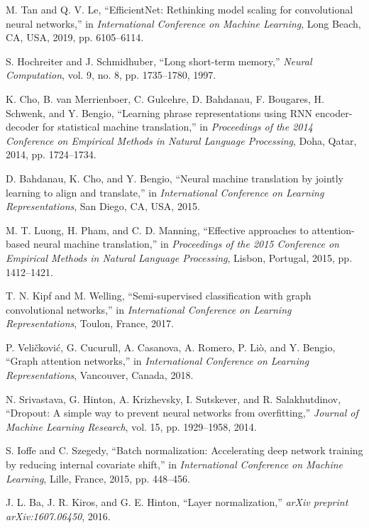 \documentclass[12pt,a4paper]{report}
\begin{document}
\begin{thebibliography}{99}
M. Tan and Q. V. Le, ``EfficientNet: Rethinking model scaling for convolutional neural networks,'' in \textit{International Conference on Machine Learning}, Long Beach, CA, USA, 2019, pp. 6105--6114.

S. Hochreiter and J. Schmidhuber, ``Long short-term memory,'' \textit{Neural Computation}, vol. 9, no. 8, pp. 1735--1780, 1997.

K. Cho, B. van Merrienboer, C. Gulcehre, D. Bahdanau, F. Bougares, H. Schwenk, and Y. Bengio, ``Learning phrase representations using RNN encoder-decoder for statistical machine translation,'' in \textit{Proceedings of the 2014 Conference on Empirical Methods in Natural Language Processing}, Doha, Qatar, 2014, pp. 1724--1734.

D. Bahdanau, K. Cho, and Y. Bengio, ``Neural machine translation by jointly learning to align and translate,'' in \textit{International Conference on Learning Representations}, San Diego, CA, USA, 2015.

M. T. Luong, H. Pham, and C. D. Manning, ``Effective approaches to attention-based neural machine translation,'' in \textit{Proceedings of the 2015 Conference on Empirical Methods in Natural Language Processing}, Lisbon, Portugal, 2015, pp. 1412--1421.

T. N. Kipf and M. Welling, ``Semi-supervised classification with graph convolutional networks,'' in \textit{International Conference on Learning Representations}, Toulon, France, 2017.

P. Veličković, G. Cucurull, A. Casanova, A. Romero, P. Liò, and Y. Bengio, ``Graph attention networks,'' in \textit{International Conference on Learning Representations}, Vancouver, Canada, 2018.

N. Srivastava, G. Hinton, A. Krizhevsky, I. Sutskever, and R. Salakhutdinov, ``Dropout: A simple way to prevent neural networks from overfitting,'' \textit{Journal of Machine Learning Research}, vol. 15, pp. 1929--1958, 2014.

S. Ioffe and C. Szegedy, ``Batch normalization: Accelerating deep network training by reducing internal covariate shift,'' in \textit{International Conference on Machine Learning}, Lille, France, 2015, pp. 448--456.

J. L. Ba, J. R. Kiros, and G. E. Hinton, ``Layer normalization,'' \textit{arXiv preprint arXiv:1607.06450}, 2016.


\end{thebibliography}
\end{document}
